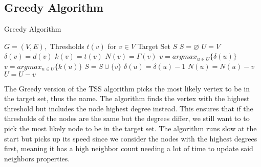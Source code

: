 \subsection{Greedy Algorithm}
\begin{algorithm}
			\caption{Greedy Algorithm}
			\begin{algorithmic}[1]
				\Require $G=(V,E),$ Thresholds $ t(v)$ for $v\in V$
				\Ensure Target Set $S$
				\State $S=\varnothing$
				\State 
				$U=V$
					\State $\delta(v)=d(v)$
					\State $k(v)=t(v)$
					\State	$N(v)=\Gamma(v)$
				\EndFor
					\State $v=argmax_{u\in U}\{\delta(u)\}$
						\State $v=argmax_{u\in U}\{k(u)\}$
						\State $S=S\cup\{v\}$
					\EndIf
						\State $\delta(u)=\delta(u)-1$
						\State $N(u)=N(u)-{v}$
					\EndFor
					\State $U=U-{v}$
				\EndWhile
			\end{algorithmic}
		\end{algorithm}
		
		The Greedy version of the TSS algorithm picks the most likely vertex to be in the target set, thus the name. The algorithm finds the vertex with the highest threshold but includes the node highest degree instead. This ensures that if the thresholds of the nodes are the same but the degrees differ, we still want to to pick the most likely node to be in the target set. The algorithm runs slow at the start but picks up its speed since we consider the nodes with the highest degrees first, meaning it has a high neighbor count needing a lot of time to update said neighbors properties.
\newpage

